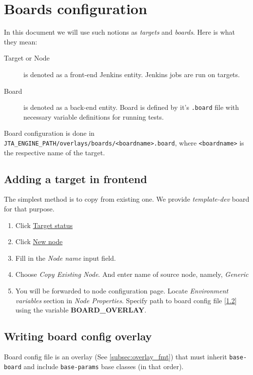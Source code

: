 \section{Boards configuration}
In this document we will use such notions as \textit{targets} and \textit{boards}. Here is what they mean:
\begin{description}
\item[Target or Node] is denoted as a front-end Jenkins entity. Jenkins jobs are run on targets.
\item[Board] is denoted as a back-end entity. Board is defined by it's \texttt{.board} file with necessary variable definitions for running tests.
\end{description}

Board configuration is done in \texttt{JTA\_ENGINE\_PATH/overlays/boards/<boardname>.board}, where \texttt{<boardname>} is the respective name of the target.

\subsection{Adding a target in frontend}
\label{sec:target-add}
The simplest method is to copy from existing one. We provide \textit{template-dev} board for that purpose.
\begin{enumerate}
\item Click \href{http://localhost:8080/computer/}{Target status}
\item Click \href{http://localhost:8080/computer/new}{New node}
\item Fill in the \textit{Node name} input field.
\item Choose \textit{Copy Existing Node}. And enter name of source node, namely, \textit{Generic}
\item You will be forwarded to node configuration page. Locate \textit{Environment variables} section in \textit{Node Properties}. Specify path to board config file [\ref{sec:board_config}] using the variable \textbf{BOARD\_OVERLAY}.
\end{enumerate}

\subsection{Writing board config overlay}
\label{sec:board_config}
Board config file is an overlay (See \ref{subsec:overlay_fmt}) that must inherit \texttt{base-board} and include \texttt{base-params} base classes (in that order).

